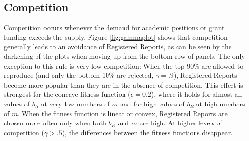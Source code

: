 \documentclass[
  ,man,mask,floatsintext]{apa6}
\begin{document}
\hypertarget{competition}{%
\subsection{Competition}\label{competition}}

Competition occurs whenever the demand for academic positions or grant funding exceeds the supply.
Figure \ref{fig:gammaplot} shows that competition generally leads to an avoidance of Registered Reports, as can be seen by the darkening of the plots when moving up from the bottom row of panels.
The only exception to this rule is very low competition:
When the top 90\% are allowed to reproduce (and only the bottom 10\% are rejected, \(\gamma = .9\)), Registered Reports become more popular than they are in the absence of competition.
This effect is strongest for the concave fitness function (\(\epsilon = 0.2\)), where it holds for almost all values of \(b_{R}\) at very low numbers of \(m\) and for high values of \(b_{R}\) at high numbers of \(m\).
When the fitness function is linear or convex, Registered Reports are chosen more often only when both \(b_{R}\) and \(m\) are high.
At higher levels of competition (\(\gamma > .5\)), the differences between the fitness functions disappear.
\end{document}
